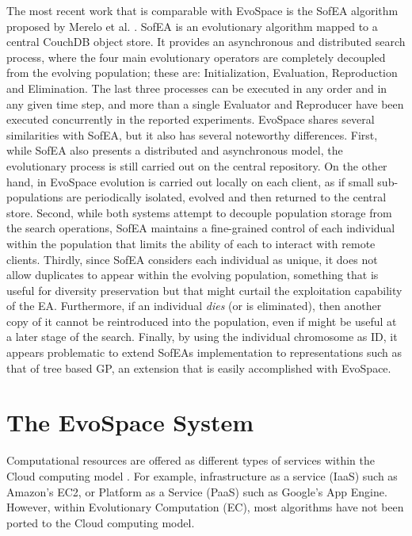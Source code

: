 The most recent work that is comparable with EvoSpace is the SofEA algorithm proposed by Merelo et al. \cite{sofea1,sofea2}.
SofEA is an evolutionary algorithm mapped to a central CouchDB object store. It provides an asynchronous and distributed search process,
where the four main evolutionary operators are completely decoupled from the evolving population; these are: Initialization, Evaluation, Reproduction and Elimination.
The last three processes can be executed in any order and in any given time step, and more than a single Evaluator and Reproducer have been executed concurrently
in the reported experiments.
EvoSpace shares several similarities with SofEA, but it also has several noteworthy differences.
First, while SofEA also presents a distributed and asynchronous model, the evolutionary process is still carried out on the central repository.
On the other hand, in EvoSpace evolution is carried out locally on each client, as if small sub-populations are periodically isolated, evolved and then returned to the central store.
Second, while both systems attempt to decouple population storage from the search operations, SofEA maintains a fine-grained control of each individual
within the population that limits the ability of each to interact with remote clients.
Thirdly, since SofEA considers each individual as unique, it does not allow duplicates to appear within the evolving population, something that is useful for diversity preservation but that might curtail the exploitation capability of the EA.
Furthermore, if an individual \emph{dies} (or is eliminated), then another copy of it cannot be reintroduced into the population, even if might be useful
at a later stage of the search.
Finally, by using the individual chromosome as ID, it appears problematic to extend SofEAs implementation to representations such as that of
tree based GP, an extension that is easily accomplished with EvoSpace.

\section{The EvoSpace System}
\label{sec:evospace}
Computational resources are offered as different types of services within the Cloud computing model \cite{cloud}.
For example, infrastructure as a service (IaaS) such as Amazon's EC2, or Platform as a Service (PaaS) such as Google's App Engine.
However, within Evolutionary Computation (EC), most algorithms have not been ported to the Cloud computing model.

